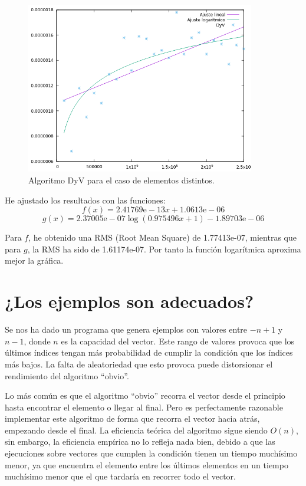 \documentclass[a4]{article}
\begin{document}
\begin{figure}[H]
  \centering
  \caption{Algoritmo DyV para el caso de elementos distintos.}
  \label{fig:dyv-repetidos}
  \includegraphics[width=100mm]{graficos/ajustes-rep}
\end{figure}

He ajustado los resultados con las funciones:
\[f(x) = 2.41769 \mbox{e} -13x + 1.0613 \mbox{e} -06\]
\[g(x) = 2.37005 \mbox{e} -07\log(0.975496x+1)-1.89703 \mbox{e} -06\]

Para $f$, he obtenido una RMS (Root Mean Square) de 1.77413e-07,
mientras que para $g$, la RMS ha sido de 1.61174e-07. Por tanto la
función logarítmica aproxima mejor la gráfica.

\section{¿Los ejemplos son adecuados?}

Se nos ha dado un programa que genera ejemplos con valores entre
$-n+1$ y $n-1$, donde $n$ es la capacidad del vector. Este rango de
valores provoca que los últimos índices tengan más probabilidad de
cumplir la condición que los índices más bajos. La falta de
aleatoriedad que esto provoca puede distorsionar el rendimiento del
algoritmo ``obvio''.

Lo más común es que el algoritmo ``obvio'' recorra el vector desde
el principio hasta encontrar el elemento o llegar al final. Pero es
perfectamente razonable implementar este algoritmo de forma que
recorra el vector hacia atrás, empezando desde el final. La
eficiencia teórica del algoritmo sigue siendo $O(n)$, sin embargo,
la eficiencia empírica no lo refleja nada bien, debido a que las
ejecuciones sobre vectores que cumplen la condición tienen un tiempo
muchísimo menor, ya que encuentra el elemento entre los últimos
elementos en un tiempo muchísimo menor que el que tardaría en
recorrer todo el vector.
\end{document}
